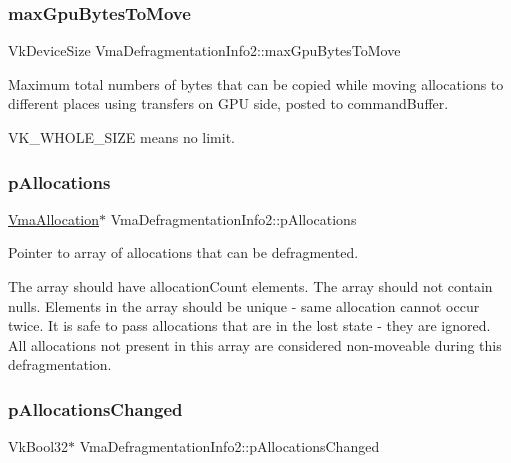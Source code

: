 \subsubsection{\texorpdfstring{max\+Gpu\+Bytes\+To\+Move}{maxGpuBytesToMove}}
{\footnotesize\ttfamily Vk\+Device\+Size Vma\+Defragmentation\+Info2\+::max\+Gpu\+Bytes\+To\+Move}



Maximum total numbers of bytes that can be copied while moving allocations to different places using transfers on G\+PU side, posted to {\ttfamily command\+Buffer}. 

{\ttfamily V\+K\+\_\+\+W\+H\+O\+L\+E\+\_\+\+S\+I\+ZE} means no limit. \mbox{\label{structVmaDefragmentationInfo2_a8943f8d65969ce8e2189a1cdf3205e96}} 
\subsubsection{\texorpdfstring{p\+Allocations}{pAllocations}}
{\footnotesize\ttfamily \hyperlink{structVmaAllocation}{Vma\+Allocation}$\ast$ Vma\+Defragmentation\+Info2\+::p\+Allocations}



Pointer to array of allocations that can be defragmented. 

The array should have {\ttfamily allocation\+Count} elements. The array should not contain nulls. Elements in the array should be unique -\/ same allocation cannot occur twice. It is safe to pass allocations that are in the lost state -\/ they are ignored. All allocations not present in this array are considered non-\/moveable during this defragmentation. \mbox{\label{structVmaDefragmentationInfo2_a76d51a644dc7f5405d0cdd0025ecd0cc}} 
\subsubsection{\texorpdfstring{p\+Allocations\+Changed}{pAllocationsChanged}}
{\footnotesize\ttfamily Vk\+Bool32$\ast$ Vma\+Defragmentation\+Info2\+::p\+Allocations\+Changed}



